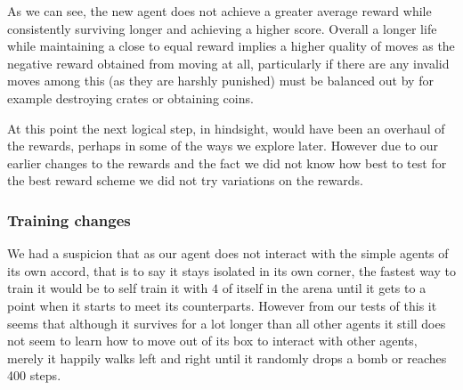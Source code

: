 As we can see, the new agent does not achieve a greater average reward while consistently surviving longer and achieving a higher score. Overall a longer life while maintaining a close to equal reward implies a higher quality of moves as the negative reward obtained from moving at all, particularly if there are any invalid moves among this (as they are harshly punished) must be balanced out by for example destroying crates or obtaining coins.

At this point the next logical step, in hindsight, would have been an overhaul of the rewards, perhaps in some of the ways we explore later. However due to our earlier changes to the rewards and the fact we did not know how best to test for the best reward scheme we did not try variations on the rewards.

\subsubsection{Training changes}
We had a suspicion that as our agent does not interact with the simple agents of its own accord, that is to say it stays isolated in its own corner, the fastest way to train it would be to self train it with $4$ of itself in the arena until it gets to a point when it starts to meet its counterparts. However from our tests of this it seems that although it survives for a lot longer than all other agents it still does not seem to learn how to move out of its box to interact with other agents, merely it happily walks left and right until it randomly drops a bomb or reaches 400 steps.

